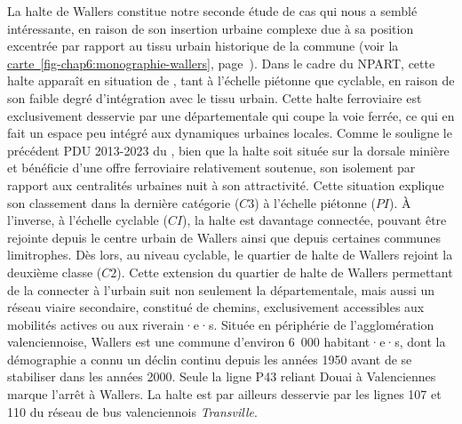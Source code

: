 \begin{refsegment}
La halte de Wallers constitue notre seconde étude de cas qui nous a semblé intéressante, en raison de son insertion urbaine complexe due à sa position excentrée par rapport au tissu urbain historique de la commune (voir la \hyperref[fig-chap6:monographie-wallers]{carte~\ref{fig-chap6:monographie-wallers}}, page~\pageref{fig-chap6:monographie-wallers}). Dans le cadre du \acrshort{NPART}, cette halte apparaît en situation de , tant à l'échelle piétonne que cyclable, en raison de son faible degré d'intégration avec le tissu urbain. Cette halte ferroviaire est exclusivement desservie par une départementale qui coupe la voie ferrée, ce qui en fait un espace peu intégré aux dynamiques urbaines locales. Comme le souligne le précédent \acrfull{PDU} 2013-2023 du \textcolor{blue}{\textcite[78]{siturv_plan_2014}}, bien que la halte soit située sur la dorsale minière et bénéficie d'une offre ferroviaire relativement soutenue, son isolement par rapport aux centralités urbaines nuit à son attractivité. Cette situation explique son classement dans la dernière catégorie (\(C3\)) à l'échelle piétonne (\(PI\)). À l'inverse, à l'échelle cyclable (\(CI\)), la halte est davantage connectée, pouvant être rejointe depuis le centre urbain de Wallers ainsi que depuis certaines communes limitrophes. Dès lors, au niveau cyclable, le quartier de halte de Wallers rejoint la deuxième classe (\(C2\)). Cette extension du quartier de halte de Wallers permettant de la connecter à l'urbain suit non seulement la départementale, mais aussi un réseau viaire secondaire, constitué de chemins, exclusivement accessibles aux mobilités actives ou aux riverain·e·s. Située en périphérie de l'agglomération valenciennoise, Wallers est une commune d'environ 6~000 habitant·e·s, dont la démographie a connu un déclin continu depuis les années 1950 avant de se stabiliser dans les années 2000. Seule la ligne P43 reliant Douai à Valenciennes marque l'arrêt à Wallers. La halte est par ailleurs desservie par les lignes 107 et 110 du réseau de bus valenciennois \textsl{Transville}.%


\end{refsegment}
